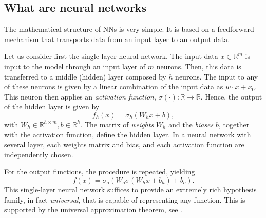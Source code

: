 \documentclass[]{report}
\begin{document}
\subsection{What are neural networks}\label{sec.what-neural-networks}
The mathematical structure of NNs is very simple. It is based on a feedforward mechanism that transports data from an input layer to an output data. 

Let us consider first the single-layer neural network. The input data $x \in \mathbb R^m$ is input to the model through an input layer of $m$ neurons. Then, this data is transferred to a middle (hidden) layer composed by $h$ neurons. The input to any of these neurons is given by a linear combination of the input data as $w \cdot x + x_0$. This neuron then applies an \textit{activation function}, $\sigma(\cdot): \mathbb R \rightarrow \mathbb R$. Hence, the output of the hidden layer is given by
\begin{equation}
f_h(x) = \sigma_h(W_h x + b), 
\end{equation} 
with $W_h \in \mathbb R^{h \times m}, b \in \mathbb R^h$. The matrix of \textit{weights} $W_h$ and the \textit{biases} $b$, together with the activation function, define the hidden layer. In a neural network with several layer, each weights matrix and bias, and each activation function are independently chosen. 

For the output functions, the procedure is repeated, yielding
\begin{equation}
f(x) = \sigma_o(W_o \sigma(W_h x + b_h) + b_o).
\end{equation}
This single-layer neural network suffices to provide an extremely rich hypothesis family, in fact \textit{universal}, that is capable of representing any function. This is supported by the universal approximation theorem, see . 
\end{document}
